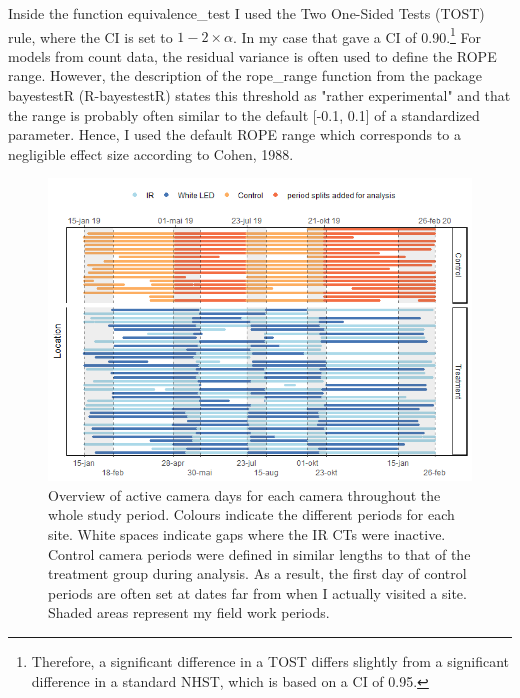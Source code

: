 Inside the function equivalence\_test I used the Two One-Sided Tests (TOST) rule, where the CI is set to $1 - 2\times \alpha$. In my case that gave a CI of 0.90.\footnote{Therefore, a significant difference in a TOST differs slightly from a significant difference in a standard NHST, which is based on a CI of 0.95.}
For models from count data, the residual variance is often used to define the ROPE range. However, the description of the rope\_range function from the package bayestestR (R-bayestestR) states this threshold as "rather experimental" and that the range is probably often similar to the default [-0.1, 0.1] of a standardized parameter.
Hence, I used the default ROPE range which corresponds to a negligible effect size according to Cohen, 1988.




\begin{figure}[b]
	\centering
	\includegraphics[width=.8\textwidth]{../R/FLM_notebook_files/figure-gfm/effort-facet-1.png}	
	\caption[An overview of active camera days]
	{\small Overview of active camera days for each camera throughout the whole study period.  
		Colours indicate the different periods for each site. White spaces indicate gaps where the IR CTs were inactive. Control camera periods were defined in similar lengths to that of the treatment group during analysis. As a result, the first day of control periods are often set at dates far from when I actually visited a site. Shaded areas represent my field work periods.}
	\label{fig:timeseries}
\end{figure}

